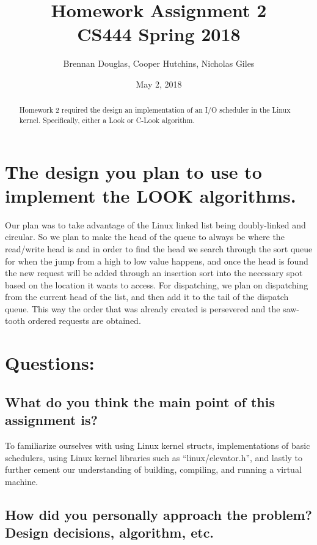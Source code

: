 \documentclass[onecolumn, draftclsnofoot,10pt, compsoc]{IEEEtran}
\title{Homework Assignment 2\\\large CS444 Spring 2018}
\author{Brennan Douglas, Cooper Hutchins, Nicholas Giles}
\date{May 2, 2018}
\begin{document}
\begin{titlingpage}
			\maketitle
      \begin{abstract}
			\noindent Homework 2 required the design an implementation of an I/O scheduler in the Linux kernel.  Specifically, either a Look or C-Look algorithm.
      \end{abstract}
\end{titlingpage}

\newpage
{}

\clearpage
\singlespace


\section{The design you plan to use to implement the LOOK algorithms.}

Our plan was to take advantage of the Linux linked list being doubly-linked and circular. So we plan to make the head of the queue to always be where the read/write head is and in order to find the head we search through the sort queue for when the jump from a high to low value happens, and once the head is found the new request will be added through an insertion sort into the necessary spot based on the location it wants to access. For dispatching, we plan on dispatching from the current head of the list, and then add it to the tail of the dispatch queue.  This way the order that was already created is persevered and the saw-tooth ordered requests are obtained.

\section{Questions:}
\subsection{What do you think the main point of this assignment is?}

To familiarize ourselves with using Linux kernel structs, implementations of basic schedulers, using Linux kernel libraries such as “linux/elevator.h”, and lastly to further cement our understanding of building, compiling, and running a virtual machine.

\subsection{How did you personally approach the problem? Design decisions, algorithm, etc.}
\end{document}
